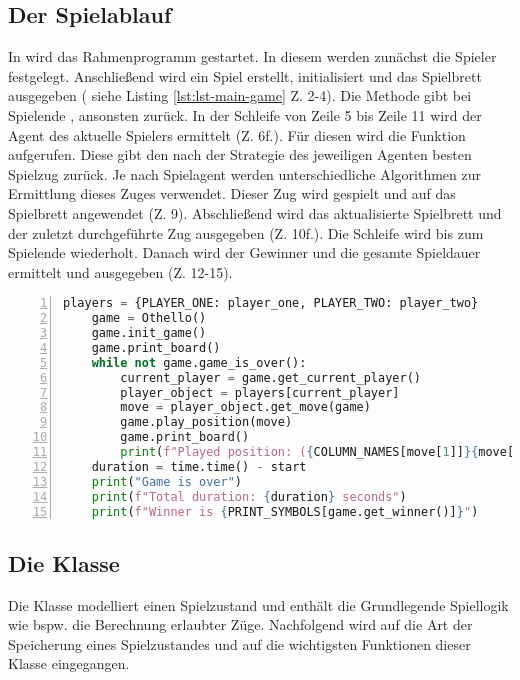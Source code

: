 \subsection{Der Spielablauf}
In  wird das Rahmenprogramm gestartet. In diesem werden zunächst die Spieler festgelegt. Anschließend wird ein Spiel erstellt, initialisiert und das Spielbrett ausgegeben ( siehe Listing \ref{lst:lst-main-game} Z. 2-4). Die Methode  gibt bei Spielende , ansonsten  zurück. In der Schleife von Zeile 5 bis Zeile 11 wird der Agent des aktuelle Spielers ermittelt (Z. 6f.). Für diesen wird die Funktion  aufgerufen. Diese gibt den nach der Strategie des jeweiligen Agenten besten Spielzug zurück. Je nach Spielagent werden unterschiedliche Algorithmen zur Ermittlung dieses Zuges verwendet. Dieser Zug wird gespielt und auf das Spielbrett angewendet (Z. 9). Abschließend wird das aktualisierte Spielbrett und der zuletzt durchgeführte Zug ausgegeben (Z. 10f.). Die Schleife wird bis zum Spielende wiederholt. Danach wird der Gewinner und die gesamte Spieldauer ermittelt und ausgegeben (Z. 12-15). 
\begin{lstlisting}[basicstyle=\footnotesize, caption = {Spielablauf in \mxZitat{main-game.py}}, language = python, captionpos = t , numbers=left, label={lst:lst-main-game}]
    players = {PLAYER_ONE: player_one, PLAYER_TWO: player_two}
    game = Othello()
    game.init_game()
    game.print_board()
    while not game.game_is_over():
        current_player = game.get_current_player()
        player_object = players[current_player]
        move = player_object.get_move(game)
        game.play_position(move)
        game.print_board()
        print(f"Played position: ({COLUMN_NAMES[move[1]]}{move[0] + 1})")
    duration = time.time() - start
    print("Game is over")
    print(f"Total duration: {duration} seconds")
    print(f"Winner is {PRINT_SYMBOLS[game.get_winner()]}")
\end{lstlisting}
\subsection{Die Klasse }
\label{ot1}
Die Klasse  modelliert einen Spielzustand und enthält die Grundlegende Spiellogik wie bspw. die Berechnung erlaubter Züge. Nachfolgend wird auf die Art der Speicherung eines Spielzustandes und auf die wichtigsten Funktionen dieser Klasse eingegangen.
